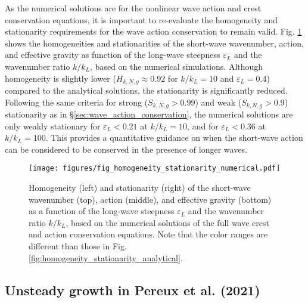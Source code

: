\documentclass[lineno]{jfm}
\begin{document}
As the numerical solutions are for the nonlinear wave action and crest conservation
equations, it is important to re-evaluate the homogeneity and stationarity
requirements for the wave action conservation to remain valid.
Fig. \ref{fig:homogeneity_stationarity_numerical} shows the homogeneities
and stationarities of the short-wave wavenumber, action, and effective gravity
as function of the long-wave steepness $\varepsilon_L$ and the wavenumber ratio
$k/k_L$, based on the numerical simulations.
Although homogeneity is slightly lower ($H_{k,N,g} \approx 0.92$ for $k/k_L = 10$
and $\varepsilon_L = 0.4$) compared to the analytical solutions,
the stationarity is significantly reduced.
Following the same criteria for strong ($S_{k,N,g} > 0.99$) and weak
($S_{k,N,g} > 0.9$) stationarity as in \S\ref{sec:wave_action_conservation},
the numerical solutions are only weakly stationary for $\varepsilon_L < 0.21$
at $k/k_L = 10$, and for $\varepsilon_L < 0.36$ at $k/k_L = 100$.
This provides a quantitative guidance on when the short-wave action can be
considered to be conserved in the presence of longer waves.

\begin{figure}
\centering
\texttt{[image: figures/fig\_homogeneity\_stationarity\_numerical.pdf]}
\caption{
Homogeneity (left) and stationarity (right) of the short-wave wavenumber (top),
action (middle), and effective gravity (bottom) as a function of the long-wave
steepness $\varepsilon_L$ and the wavenumber ratio $k/k_L$, based on the
numerical solutions of the full wave crest and action conservation equations.
Note that the color ranges are different than those in Fig. \ref{fig:homogeneity_stationarity_analytical}.
}
\label{fig:homogeneity_stationarity_numerical}
\end{figure}

\subsection{Unsteady growth in Pereux et al. (2021)}
\label{subsection:unsteady_growth}
\end{document}

